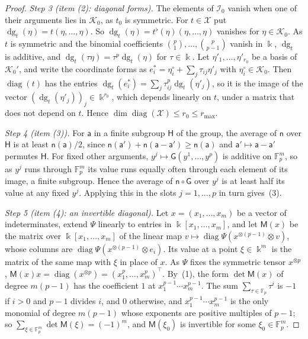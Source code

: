 \documentclass[11pt]{amsart}
\theoremstyle{definition}
\theoremstyle{remark}
\numberwithin{equation}{section}
\newcommand{\F}{\mathbb F}
\theoremstyle{plain}
\theoremstyle{definition}
\theoremstyle{plain}
\begin{document}
\begin{proof}
\emph{Step 3 (item (2): diagonal forms).} The elements of $\mathcal I_0$ vanish when one of their arguments lies in
$\mathcal K_0$, as $t_0$ is symmetric. For $t\in\mathcal X$ put $\operatorname{dg}_t(\eta)=t(\eta,\dots,\eta)$. So $\operatorname{dg}_t(\eta)=t^\flat(\eta)(\eta,\dots,\eta)$
vanishes for $\eta\in\mathcal K_0$. As $t$ is symmetric and the binomial coefficients
$\binom p1,\dots,\binom p{p-1}$ vanish in $\Bbbk$, $\operatorname{dg}_t$ is additive, and $\operatorname{dg}_t(\tau\eta)=\tau^p\operatorname{dg}_t(\eta)$ for
$\tau\in\Bbbk$. Let $\eta'_1,\dots,\eta'_{r_0}$ be a basis of $\mathcal K_0'$, and write the coordinate forms as
$e_i^*=\eta_i^\circ+\sum_j\tau_{ij}\eta'_j$ with $\eta_i^\circ\in\mathcal K_0$. Then $\operatorname{diag}(t)$ has the entries
$\operatorname{dg}_t(e_i^*)=\sum_j\tau_{ij}^p\operatorname{dg}_t(\eta'_j)$, so it is the image of the vector $(\operatorname{dg}_t(\eta'_j))_j\in\Bbbk^{r_0}$,
which depends linearly on $t$, under a matrix that does not depend on $t$. Hence
$\dim\operatorname{diag}(\mathcal X)\le r_0\le r_{\max}$.

\emph{Step 4 (item (3)).} For $\mathsf a$ in a finite subgroup $\mathsf H$ of the group, the average of $\mathsf n$ over $\mathsf H$ is at least
$\mathsf n(\mathsf a)/2$, since $\mathsf n(\mathsf a')+\mathsf n(\mathsf a-\mathsf a')\ge\mathsf n(\mathsf a)$ and $\mathsf a'\mapsto\mathsf a-\mathsf a'$ permutes $\mathsf H$. For fixed other arguments,
$y^j\mapsto\mathsf G(y^1,\dots,y^p)$ is additive on $\F_p^m$, so as $y^j$ runs through $\F_p^m$ its value runs equally often
through each element of its image, a finite subgroup. Hence the average of $\mathsf n\circ\mathsf G$ over $y^j$ is at least half its
value at any fixed $y^j$. Applying this in the slots $j=1,\dots,p$ in turn gives~(3).

\emph{Step 5 (item (4): an invertible diagonal).} Let $x=(x_1,\dots,x_m)$ be a vector of indeterminates, extend $\Psi$
linearly to entries in $\Bbbk[x_1,\dots,x_m]$, and let $\mathsf M(x)$ be the matrix over $\Bbbk[x_1,\dots,x_m]$ of the
linear map $v\mapsto\operatorname{diag}\Psi(x^{\otimes(p-1)}\otimes v)$, whose columns are
$\operatorname{diag}\Psi(x^{\otimes(p-1)}\otimes e_i)$. Its value at a point $\xi\in\Bbbk^m$ is the matrix of the same
map with $\xi$ in place of $x$. As $\Psi$ fixes the symmetric tensor $x^{\otimes p}$,
$\mathsf M(x)x=\operatorname{diag}(x^{\otimes p})=(x_1^p,\dots,x_m^p)^{\top}$. By~(1), the form
$\det\mathsf M(x)$ of degree $m(p-1)$ has the coefficient $1$ at $x_1^{p-1}\cdots x_m^{p-1}$. The sum
$\sum_{\tau\in\F_p}\tau^i$ is $-1$ if $i>0$ and $p-1$ divides $i$, and $0$ otherwise, and $x_1^{p-1}\cdots x_m^{p-1}$ is the
only monomial of degree $m(p-1)$ whose exponents are positive multiples of $p-1$; so
$\sum_{\xi\in\F_p^m}\det\mathsf M(\xi)=(-1)^m$, and $\mathsf M(\xi_0)$ is invertible for some $\xi_0\in\F_p^m$.


\end{proof}
\end{document}
